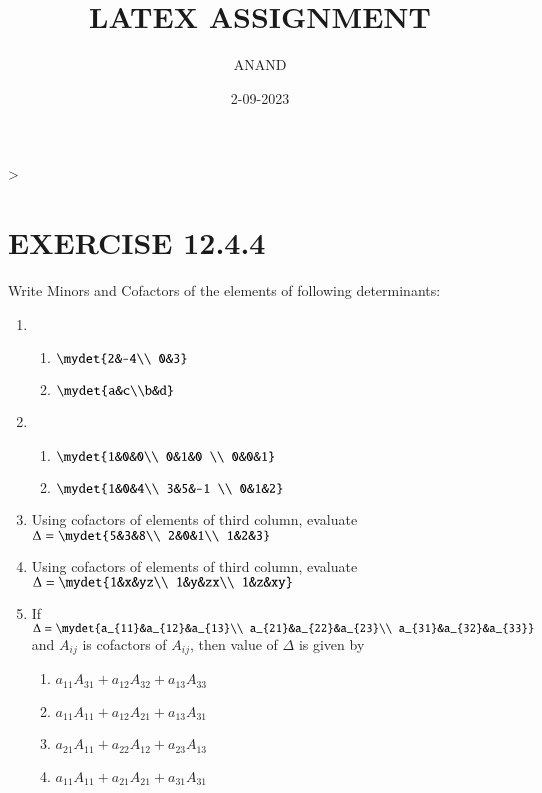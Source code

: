 \documentclass{article}
\theoremstyle{remark}
\begin{document}
\title{LATEX ASSIGNMENT}
\author{ANAND}
\date{2-09-2023}
\maketitle                                                                       >
\section*{EXERCISE 12.4.4}
Write Minors and Cofactors of the elements of following determinants:
\begin{enumerate}
\item
\begin{enumerate}[label=(\roman*)]
\item $\mydet{2&-4\\ 0&3}$
\item $\mydet{a&c\\b&d}$
\end{enumerate}
\item
\begin{enumerate}[label=(\roman*)]
\item $\mydet{1&0&0\\ 0&1&0 \\ 0&0&1}$
\item $\mydet{1&0&4\\ 3&5&-1 \\ 0&1&2}$
\end{enumerate}
\item Using cofactors of elements of third column, evaluate $\Delta= \mydet{5&3&8\\ 2&0&1\\ 1&2&3}$
\item Using cofactors of elements of third column, evaluate $\Delta= \mydet{1&x&yz\\ 1&y&zx\\ 1&z&xy}$
\item If $\Delta= \mydet{a_{11}&a_{12}&a_{13}\\ a_{21}&a_{22}&a_{23}\\ a_{31}&a_{32}&a_{33}}$ and $A_{ij}$ is cofactors of $A_{ij}$, then value of $\Delta$ is given by
\begin{enumerate}[label=(\roman*)]
\item $a_{11} A_{31}+a_{12} A_{32}+a_{13} A_{33}$
\item $a_{11} A_{11}+a_{12} A_{21}+a_{13} A_{31}$
\item $a_{21} A_{11}+a_{22} A_{12}+a_{23} A_{13}$
\item $a_{11} A_{11}+a_{21} A_{21}+a_{31} A_{31}$
\end{enumerate}
\end{enumerate}
\end{document}
